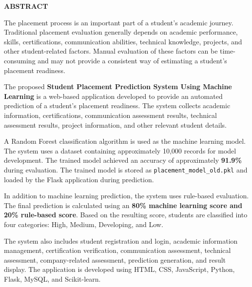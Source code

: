 \documentclass[12pt,a4paper]{report}
\begin{document}
\begin{center}
    {\large\textbf{ABSTRACT}}
\end{center}

\vspace{0.45cm}

\noindent
The placement process is an important part of a student's
academic journey. Traditional placement evaluation generally
depends on academic performance, skills, certifications,
communication abilities, technical knowledge, projects, and
other student-related factors. Manual evaluation of these
factors can be time-consuming and may not provide a consistent
way of estimating a student's placement readiness.

\vspace{0.15cm}

\noindent
The proposed \textbf{Student Placement Prediction System Using
Machine Learning} is a web-based application developed to
provide an automated prediction of a student's placement
readiness. The system collects academic information,
certifications, communication assessment results, technical
assessment results, project information, and other relevant
student details.

\vspace{0.15cm}

\noindent
A Random Forest classification algorithm is used as the machine
learning model. The system uses a dataset containing approximately
10,000 records for model development. The trained model achieved
an accuracy of approximately \textbf{91.9\%} during evaluation.
The trained model is stored as
\texttt{placement\_model\_old.pkl} and loaded by the Flask
application during prediction.

\vspace{0.15cm}

\noindent
In addition to machine learning prediction, the system uses
rule-based evaluation. The final prediction is calculated using
an \textbf{80\% machine learning score and 20\% rule-based score}.
Based on the resulting score, students are classified into four
categories: High, Medium, Developing, and Low.

\vspace{0.15cm}

\noindent
The system also includes student registration and login,
academic information management, certification verification,
communication assessment, technical assessment, company-related
assessment, prediction generation, and result display. The
application is developed using HTML, CSS, JavaScript, Python,
Flask, MySQL, and Scikit-learn.
\end{document}

